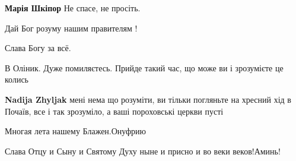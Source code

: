 \begin{itemize}
\begin{itemize}
\textbf{Марія Шкіпор} Не спасе, не просіть.
\end{itemize}

 
Дай Бог розуму нашим правителям !

 
Слава Богу за всё.

 
В Оліник. Дуже помиляєтесь. Прийде такий час, що може ви і зрозумієте це колись

\begin{itemize}
 
\textbf{Nadija Zhyljak} мені нема що розуміти, ви тільки погляньте на хресний
хід в Почаїв, все і так зрозуміло, а ваші пороховські церкви пусті
\end{itemize}

 
Многая лета нашему Блажен.Онуфрию

 
Слава Отцу и Сыну и Святому Духу ныне и присно и во веки веков!Аминь!


\end{itemize}
